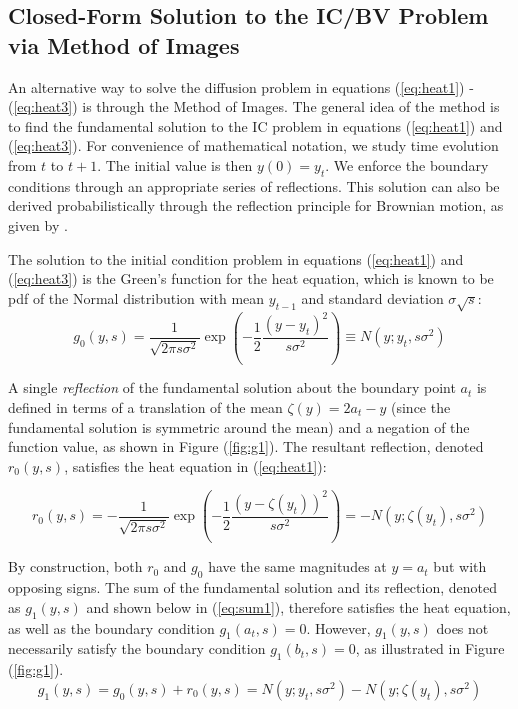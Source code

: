 \subsection{Closed-Form Solution to the IC/BV Problem via Method of Images}
An alternative way to solve the diffusion problem in equations (\ref{eq:heat1}) - (\ref{eq:heat3}) is through the Method of Images. The general idea of the method is to find the fundamental solution to the IC problem in equations (\ref{eq:heat1}) and (\ref{eq:heat3}). For convenience of mathematical notation, we study time evolution from $t$ to $t+1$. The initial value is then $y(0) = y_t$. We enforce the boundary conditions through an appropriate series of reflections. This solution can also be derived probabilistically through the reflection principle for Brownian motion, as given by \cite{freedman1971brownian}.

The solution to the initial condition problem in equations (\ref{eq:heat1}) and (\ref{eq:heat3}) is the Green's function for the heat equation, which is known to be pdf of the Normal distribution with mean $y_{t-1}$ and standard deviation $\sigma \sqrt{s}$:
\begin{equation}
	g_0(y,s) = \frac{1}{\sqrt{2\pi s \sigma^2}} \exp\left( -\frac{1}{2} \frac{(y-y_t)^2}{s\sigma^2} \right) \equiv N(y; y_t, s\sigma^2) \label{eq:fundamental-solution}
\end{equation}

A single \textit{reflection} of the fundamental solution about the boundary point $a_t$ is defined in terms of a translation of the mean $\zeta(y) = 2a_t - y$ (since the fundamental solution is symmetric around the mean) and a negation of the function value, as shown in Figure (\ref{fig:g1}). The resultant reflection, denoted $r_0(y,s)$, satisfies the heat equation in (\ref{eq:heat1}):

\[ r_0(y,s) = -\frac{1}{\sqrt{2\pi s \sigma^2}} \exp\left( -\frac{1}{2} \frac{( y-\zeta(y_t) )^2}{s\sigma^2} \right) = -N(y; \zeta(y_t), s\sigma^2) \]

By construction, both $r_0$ and $g_0$ have the same magnitudes at $y = a_t$ but with opposing signs. The sum of the fundamental solution and its reflection, denoted as $g_1(y,s)$ and shown below in (\ref{eq:sum1}), therefore satisfies the heat equation, as well as  the boundary condition $g_1(a_t, s) = 0$. However, $g_1(y,s)$ does not necessarily satisfy the boundary condition $g_1(b_t, s) = 0$, as illustrated in Figure (\ref{fig:g1}).
%
\begin{equation} 
g_1(y,s) = g_0(y,s) + r_0(y,s) = N(y; y_t, s\sigma^2) - N(y; \zeta(y_t), s\sigma^2) \label{eq:sum1}
\end{equation}
%

